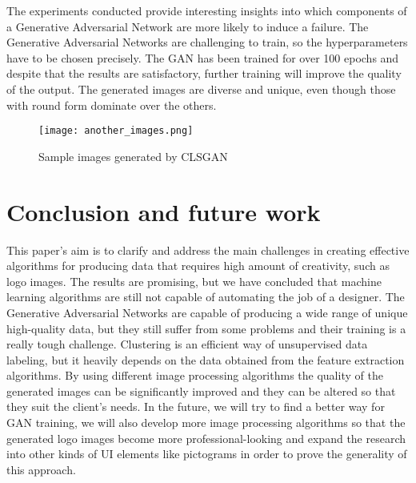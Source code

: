 \documentclass{article}
\begin{document}
The experiments conducted provide interesting insights into which components of a Generative Adversarial Network are more likely to induce a failure. The Generative Adversarial Networks are challenging to train, so the hyperparameters have to be chosen precisely. The GAN has been trained for over 100 epochs and despite that the results are satisfactory, further training will improve the quality of the output. The generated images are diverse and unique, even though those with round form dominate over the others.

\begin{figure}[ht]
    \centering
    \texttt{[image: another\_images.png]}
    \caption{Sample images generated by CLSGAN}
    \label{fig:sample_images}
\end{figure}


\section{Conclusion and future work}
This paper’s aim is to clarify and address the main challenges in creating effective algorithms for producing data that requires high amount of creativity, such as logo images. The results are promising, but we have concluded that machine learning algorithms are still not capable of automating the job of a designer. The Generative Adversarial Networks are capable of producing a wide range of unique high-quality data, but they still suffer from some problems and their training is a really tough challenge. Clustering is an efficient way of unsupervised data labeling, but it heavily depends on the data obtained from the feature extraction algorithms. By using different image processing algorithms the quality of the generated images can be significantly improved and they can be altered so that they suit the client's needs. In the future, we will try to find a better way for GAN training, we will also develop more image processing algorithms so that the generated logo images become more professional-looking and expand the research into other kinds of UI elements like pictograms in order to prove the generality of this approach.

\newpage

\printbibliography
\end{document}
